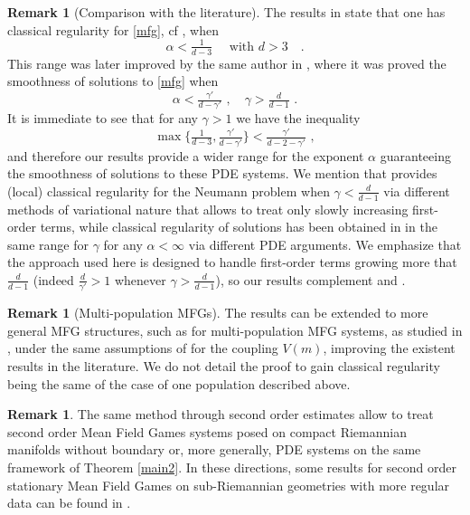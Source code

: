 \documentclass[10pt, a4paper, reqno, oneside]{amsart}
\theoremstyle{plain}
\theoremstyle{definition}
\newtheorem{rem}[theo]{Remark}
\theoremstyle{plain}
\theoremstyle{definition}
\theoremstyle{plain}
\renewcommand{\=}{:=}
\begin{document}
\begin{rem}[Comparison with the literature]\label{rem:exp}
The results in \cite{CirantJMPA} state that one has classical regularity for \eqref{mfg}, cf \cite[Remark 8]{CirantJMPA}, when
$$
\alpha<\tfrac{1}{d-3} \quad \text{ with $d>3$ } \,\, .
$$
This range was later improved by the same author in \cite[Theorem 1.4]{CCPDE}, where it was proved the smoothness of solutions to \eqref{mfg} when 
$$
\alpha<\tfrac{\gamma'}{d-\gamma'} \,\, , \quad \gamma>\tfrac{d}{d-1} \,\, .
$$
It is immediate to see that for any $\gamma>1$ we have the inequality
$$
\max \big\{\tfrac{1}{d-3},\tfrac{\gamma'}{d-\gamma'}\big\} < \tfrac{\gamma'}{d-2-\gamma'} \,\, ,
$$
and therefore our results provide a wider range for the exponent $\alpha$ guaranteeing the smoothness of solutions to these PDE systems. We mention that \cite[Proposition 3.6]{Alpar} provides (local) classical regularity for the Neumann problem when $\gamma<\frac{d}{d-1}$ via different methods of variational nature that allows to treat only slowly increasing first-order terms, while classical regularity of solutions has been obtained in \cite[Theorem 1.4]{CCPDE} in the same range for $\gamma$ for any $\alpha<\infty$ via different PDE arguments. We emphasize that the approach used here is designed to handle first-order terms growing more that $\frac{d}{d-1}$ (indeed $\frac{d}{\gamma'}>1$ whenever $\gamma>\frac{d}{d-1}$), so our results complement \cite[Theorem 1.4]{CCPDE} and \cite[Proposition 3.6]{Alpar}.
\end{rem}

\begin{rem}[Multi-population MFGs]
The results can be extended to more general MFG structures, such as for multi-population MFG systems, as studied in \cite{CirantJMPA,Alpar}, under the same assumptions of \cite[Theorem 7]{CirantJMPA} for the coupling $V(m)$, improving the existent results in the literature. We do not detail the proof to gain classical regularity being the same of the case of one population described above.
\end{rem}

\begin{rem}
The same method through second order estimates allow to treat second order Mean Field Games systems posed on compact Riemannian manifolds without boundary or, more generally, PDE systems on the same framework of Theorem \ref{main2}. In these directions, some results for second order stationary Mean Field Games on sub-Riemannian geometries with more regular data can be found in \cite{DF}.
\end{rem}
\end{document}
